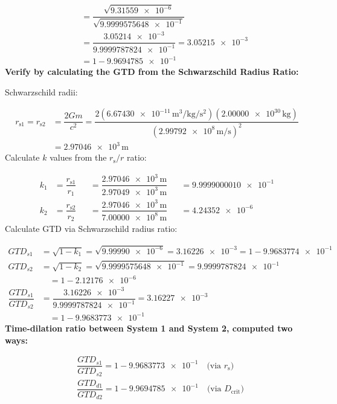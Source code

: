 \documentclass[twoside,twocolumn,9pt,fleqn]{article}
\begin{document}
\begin{mdframed}
\begin{align*}
&\quad = \dfrac{\sqrt{\num{9.31559e-6}}}{\sqrt{\num{9.9999575648e-1}}}\\
&\quad = \dfrac{\num{3.05214e-3}}{\num{9.9999787824e-1}} = \num{3.05215e-3}\\
&\quad = 1-\num{9.9694785e-1}
\end{align*}
\noindent\textbf{Verify by calculating the GTD from the Schwarzschild Radius Ratio:}\par
\noindent Schwarzschild radii:\par
\begin{align*}
r_{\mathrm{s}1} = r_{\mathrm{s}2} &= \dfrac{2Gm}{c^2} = \dfrac{2(\num{6.67430e-11}\,\unit{\meter\cubed\per\kilogram\per\second\squared})(\num{2.00000e30}\,\unit{\kilogram})}{(\num{2.99792e8}\,\unit{\meter\per\second})^2}\\
&= \num{2.97046e3}\,\unit{\meter}
\end{align*}
\noindent Calculate $k$ values from the $r_{\mathrm{s}}/r$ ratio:\par
\begin{align*}
k_1 &= \dfrac{r_{\mathrm{s}1}}{r_1} &&= \dfrac{\num{2.97046e3}\,\unit{\meter}}{\num{2.97049e3}\,\unit{\meter}} &&= \num{9.9999000010e-1}\\
k_2 &= \dfrac{r_{\mathrm{s}2}}{r_2} &&= \dfrac{\num{2.97046e3}\,\unit{\meter}}{\num{7.00000e8}\,\unit{\meter}} &&= \num{4.24352e-6}
\end{align*}
\noindent Calculate GTD via Schwarzschild radius ratio:\par
\begin{align*}
GTD_{s1} &= \sqrt{1-k_1} = \sqrt{\num{9.99990e-6}} = \num{3.16226e-3} = 1-\num{9.9683774e-1}\\
GTD_{s2} &= \sqrt{1-k_2} = \sqrt{\num{9.9999575648e-1}} = \num{9.9999787824e-1}\\
&\quad = 1-\num{2.12176e-6}\\
\dfrac{GTD_{s1}}{GTD_{s2}} &= \dfrac{\num{3.16226e-3}}{\num{9.9999787824e-1}} = \num{3.16227e-3}\\
&\quad = 1-\num{9.9683773e-1}
\end{align*}
\noindent\textbf{Time-dilation ratio between System 1 and System 2, computed two ways:}\par
\begin{align*}
&\dfrac{GTD_{s1}}{GTD_{s2}} = 1-\num{9.9683773e-1} \quad \text{(via $r_{\mathrm{s}}$)}\\
&\dfrac{GTD_{d1}}{GTD_{d2}} = 1-\num{9.9694785e-1} \quad \text{(via $D_{\mathrm{crit}}$)}
\end{align*}
\end{mdframed}
\end{document}
